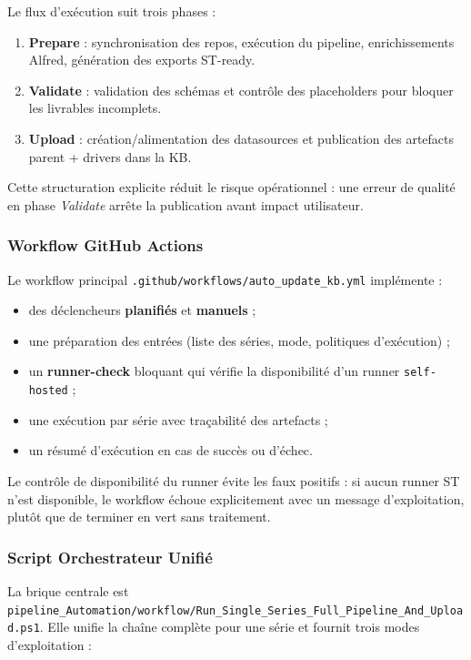 Le flux d'exécution suit trois phases :
\begin{enumerate}
  \item \textbf{Prepare} : synchronisation des repos, exécution du pipeline, enrichissements Alfred, génération des exports ST-ready.
  \item \textbf{Validate} : validation des schémas et contrôle des placeholders pour bloquer les livrables incomplets.
  \item \textbf{Upload} : création/alimentation des datasources et publication des artefacts parent + drivers dans la KB.
\end{enumerate}

Cette structuration explicite réduit le risque opérationnel : une erreur de qualité en phase \textit{Validate} arrête la publication avant impact utilisateur.

\subsubsection{Workflow GitHub Actions}

Le workflow principal \texttt{.github/workflows/auto\_update\_kb.yml} implémente :
\begin{itemize}
  \item des déclencheurs \textbf{planifiés} et \textbf{manuels} ;
  \item une préparation des entrées (liste des séries, mode, politiques d'exécution) ;
  \item un \textbf{runner-check} bloquant qui vérifie la disponibilité d'un runner \texttt{self-hosted} ;
  \item une exécution par série avec traçabilité des artefacts ;
  \item un résumé d'exécution en cas de succès ou d'échec.
\end{itemize}

Le contrôle de disponibilité du runner évite les faux positifs : si aucun runner ST n'est disponible, le workflow échoue explicitement avec un message d'exploitation, plutôt que de terminer en vert sans traitement.

\subsubsection{Script Orchestrateur Unifié}

La brique centrale est \texttt{pipeline\_Automation/workflow/Run\_Single\_Series\_Full\_Pipeline\_And\_Upload.ps1}. Elle unifie la chaîne complète pour une série et fournit trois modes d'exploitation :

